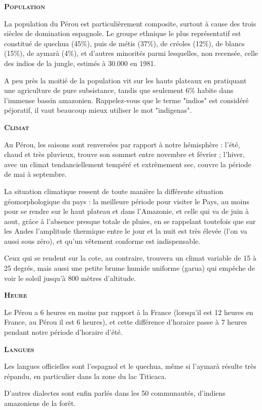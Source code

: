 \begin{multicols}{2}
\textbf{\textsc{Population}}

La population du Pérou est particulièrement composite, surtout à cause des trois siècles de domination espagnole. Le groupe ethnique le plus représentatif est constitué de quechua (45\%), puis de métis (37\%), de créoles (12\%), de blancs (15\%), de aymarà (4\%), et d'autres minorités parmi lesquelles, non recensée, celle des indios de la jungle, estimés à 30.000 en 1981.

A peu près la moitié de la population vit sur les hauts plateaux en pratiquant une agriculture de pure subsistance, tandis que seulement 6\% habite dans l'immense bassin amazonien. Rappelez-vous que le terme "indios" est considéré péjoratif, il vaut beaucoup mieux utiliser le mot "indigenas".

\textbf{\textsc{Climat}}

Au Pérou, les saisons sont renversées par rapport à notre hémisphère : l'été, chaud et très pluvieux, trouve son sommet entre novembre et février ; l'hiver, avec un climat tendanciellement tempéré et extrêmement sec, couvre la période de mai à septembre.

La situation climatique ressent de toute manière la différente situation géomorphologique du pays : la meilleure période pour visiter le Pays, au moins pour se rendre sur le haut plateau et dans l'Amazonie, et celle qui va de juin à aout, grâce à l'absence presque totale de pluies, en se rappelant toutefois que sur les Andes l'amplitude thermique entre le jour et la nuit est très élevée (l'on va aussi sous zéro), et qu'un vêtement conforme est indispensable.

Ceux qui se rendent sur la cote, au contraire, trouvera un climat variable de 15 à 25 degrés, mais aussi une petite brume humide uniforme (garua) qui empêche de voir le soleil jusqu'à 800 mètres d'altitude.

\textbf{\textsc{Heure}}

Le Pérou a 6 heures en moins par rapport à la France (lorsqu'il est 12 heures en France, au Pérou il est 6 heures), et cette différence d'horaire passe à 7 heures pendant notre période d'horaire d'été.

\textbf{\textsc{Langues}}

Les langues officielles sont l'espagnol et le quechua, même si l'aymarà résulte très répandu, en particulier dans la zone du lac Titicaca.

D'autres dialectes sont enfin parlés dans les 50 communautés, d'indiens amazoniens de la forêt.


\end{multicols}
